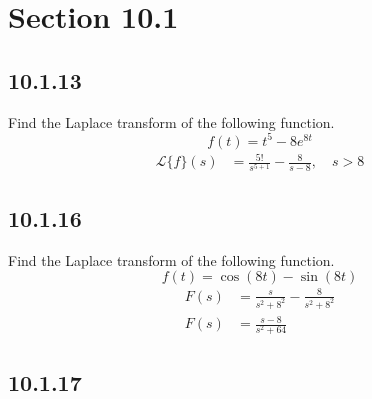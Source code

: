 \documentclass{article}
\begin{document}
\newcommand{\hr}{\par\noindent\rule{\textwidth}{0.4pt}}

\newcommand{\bc}[1]{
	\begin{equation*}
		\begin{boxed}
			{#1}
		\end{boxed}
	\end{equation*}
}

\newcommand{\cond}[2]{
	\ifmmode
		{#1} \quad {#2}
	\else
		$$ {#1} \quad {#2} $$
	\fi
}

\newcommand{\matr}[1]{
	\ifmmode \bm{#1}
	\else \textit{\textbf{#1}}
	\fi
}
\newcommand{\vect}[1]{
	\ifmmode \mathbf{#1}
	\else \textbf{#1}
	\fi
}

\tableofcontents

\section{Section 10.1}

\subsection{10.1.13}

Find the Laplace transform of the following function.
\begin{equation*}
	f(t) = t^5 - 8e^{8t}
\end{equation*}
\begin{align*}
	\mathcal{L}\{f\}(s) & = \frac{5!}{s^{5 + 1}} - \frac{8}{s - 8}, \quad s > 8
\end{align*}

\subsection{10.1.16}

Find the Laplace transform of the following function.
\begin{equation*}
	f(t) = \cos(8t) - \sin(8t)
\end{equation*}
\begin{align*}
	F(s) & = \frac{ s }{ s^2 + 8^2 } - \frac{ 8 }{ s^2 + 8^2 } \\
	F(s) & = \frac{ s - 8 }{ s^2 + 64 }
\end{align*}

\subsection{10.1.17}
\end{document}
